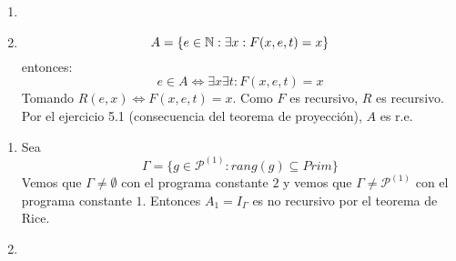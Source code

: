\documentclass[11pt]{article}
\let \sii \Leftrightarrow
\begin{document}
\begin{ejercicio}{1}
\end{ejercicio}
\begin{solucion}
\begin{enumerate}
	\item 
	\item \[ A = \{ e \in \mathbb{N} : \exists x : F(x,e,t) = x \} \]
entonces:
\[ e \in A \sii \exists x \exists t : F(x,e,t) = x \]
Tomando $R(e,x) \sii F(x,e,t) = x$. Como $F$ es recursivo, $R$ es recursivo. Por el ejercicio 5.1 (consecuencia del teorema de proyección), $A$ es r.e.
\end{enumerate}
\end{solucion}

\begin{ejercicio}{2}
\end{ejercicio}
\begin{solucion}
\begin{enumerate}
	\item Sea
	\[  Γ = \{g \in \mathcal{P}^{(1)} : rang(g) \subseteq Prim\} \]
	Vemos que $Γ \neq \emptyset$ con el programa constante $2$ y vemos que $Γ \neq \mathcal{P}^{(1)}$ con el programa constante $1$. Entonces $A_1 = I_Γ$ es no recursivo por el teorema de Rice.
	
	\item %
\end{enumerate}
\end{solucion}
\end{document}
